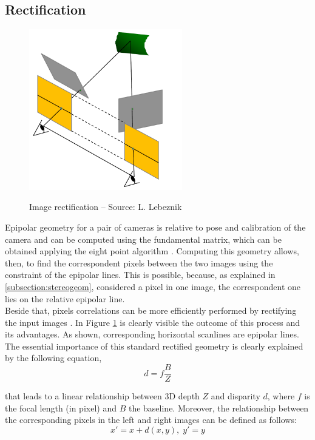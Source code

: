 \subsection{Rectification}
\label{subsection:rectification}
\begin{figure}[t]
	\begin{center}
		{\includegraphics[width=.8\textwidth, height=7cm, keepaspectratio]{images/rectification}}
\caption{Image rectification -- Source: L. Lebeznik}
\label{fig:rectification}
	\end{center}
\end{figure}

Epipolar geometry for a pair of cameras is relative to pose and calibration of the camera and can be computed using the fundamental matrix, which can be obtained applying the eight point algorithm \citep{hartley2004multiple}.
Computing this geometry allows, then, to find the correspondent pixels between the two images using the constraint of the epipolar lines.
This is possible, because, as explained in \ref{subsection:stereogeom}, considered a pixel in one image, the correspondent one lies on the relative epipolar line.\\
Beside that, pixels correlations can be more efficiently performed by rectifying the input images \citep{hartley2004multiple}.
In Figure \ref{fig:rectification} is clearly visible the outcome of this process and its advantages.
As shown, corresponding horizontal scanlines are epipolar lines. 
The essential importance of this standard rectified geometry is clearly explained by the following equation,
\begin{equation} \label{eqn:disparity-depth}
	d = f \frac{B}{Z}
\end{equation}

that leads to a linear relationship between 3D depth $Z$ and disparity $d$, where $f$ is the focal length (in pixel) and $B$ the baseline.
Moreover, the relationship between the corresponding pixels in the left and right images can be defined as follows:
\begin{equation} \label{eqn:corresponding-pixel}
	x' = x + d(x, y), \; y' = y
\end{equation}

